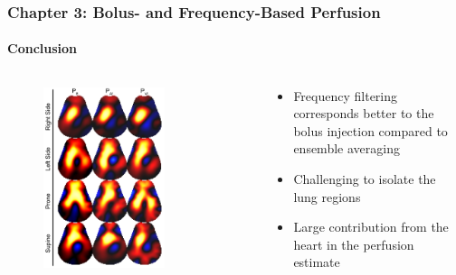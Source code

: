 \documentclass[10pt,    %
    english,            %
    xcolor=table,       %
    envcountsect,        %
    aspectratio=1610
]{beamer}
\begin{document}
\begin{frame}
	\frametitle{Chapter 3: Bolus- and Frequency-Based Perfusion}
	\framesubtitle{Conclusion}
	\begin{columns}[c]
		\begin{column}{0.5\textwidth}
	\begin{figure}
		\centering
	\includegraphics[width=0.7\textwidth,trim={0 0 0 0cm},clip]{imgs/fig-discussionSample.pdf}
	\end{figure}
\end{column}
\begin{column}{0.5\textwidth}
	\begin{itemize}
		\item Frequency filtering corresponds better to the bolus injection compared to ensemble averaging
		\item Challenging to isolate the lung regions
		\item Large contribution from the heart in the perfusion estimate
	\end{itemize}
\end{column}
\end{columns}
\end{frame}
\end{document}
